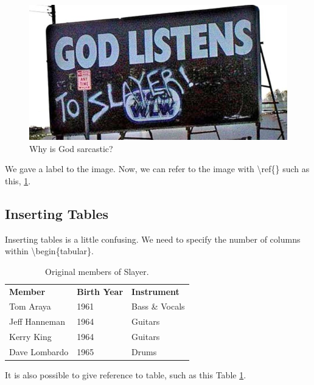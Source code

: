 \documentclass[12pt]{article}
\begin{document}
\begin{figure}[h] 
\begin{center}
\includegraphics[scale=0.5]{slayer.jpg}
\caption{Why is God sarcastic?}
\label{figSlayer}
\end{center}
\end{figure}

We gave a label to the image. Now, we can refer to the image with \textbackslash ref\{\} such as this, \ref{figSlayer}.

\newpage

\subsection{Inserting Tables} \label{tables}

Inserting tables is a little confusing. We need to specify the number of columns within \textbackslash begin\{tabular\}.

\begin{table}[h]
\caption{Original members of Slayer.}
\label{tabSlayer}
\begin{tabular}{lll}
\textbf{Member}	& \textbf{Birth Year}	& \textbf{Instrument} \\
Tom Araya 		& 1961					& Bass \& Vocals \\
Jeff Hanneman	& 1964					& Guitars \\
Kerry King 		& 1964					& Guitars \\
Dave Lombardo	& 1965					& Drums 
\end{tabular}
\end{table}

It is also possible to give reference to table, such as this Table \ref{tabSlayer}. 
\end{document}
